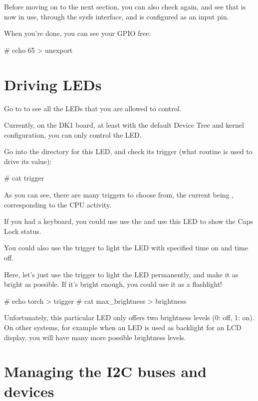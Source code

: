 Before moving on to the next section, you can also check
 again, and see that  is now
in use, through the sysfs interface, and is configured as an input pin.

When you're done, you can see your GPIO free:

\begin{bashinput}
# echo 65 > unexport
\end{bashinput}

\section{Driving LEDs}

Go to  to see all the LEDs that you are allowed
to control.

Currently, on the DK1 board, at least with the default Device Tree and
kernel configuration, you can only control the  LED.

Go into the directory for this LED, and check its trigger (what
routine is used to drive its value):

\begin{bashinput}
# cat trigger
\end{bashinput}

As you can see, there are many triggers to choose from, the current
being , corresponding to the CPU activity.

If you had a keyboard, you could use use the 
and use this LED to show the Caps Lock status.

You could also use the  trigger to light the LED
with specified time on and time off.

Here, let's just use the  trigger to light the LED
permanently, and make it as bright as possible. If it's bright enough,
you could use it as a flashlight!

\begin{bashinput}
# echo torch > trigger
# cat max_brightness > brightness
\end{bashinput}

Unfortunately, this particular LED only offers two brightness
levels (0: off, 1: on). On other systems, for example when an LED
is used as backlight for an LCD display, you will have many
more possible brightness levels.

\section{Managing the I2C buses and devices}

